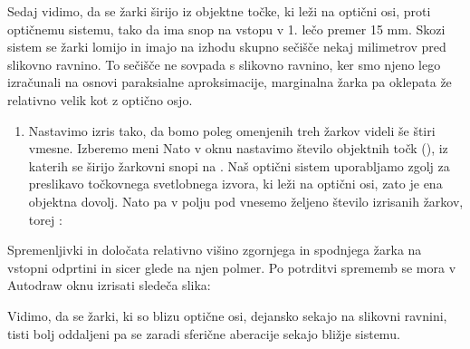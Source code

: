 \documentclass[letterpaper,10pt,english]{sphinxmanual}
\begin{document}
\begin{figure}[htbp]
\centering

\noindent{}
\end{figure}

\sphinxAtStartPar
Sedaj vidimo, da se žarki širijo iz objektne točke, ki leži na optični osi, proti optičnemu sistemu, tako da ima snop na vstopu v 1. lečo premer 15 mm. Skozi sistem se žarki lomijo in imajo na izhodu skupno sečišče nekaj milimetrov pred slikovno ravnino. To sečišče ne sovpada s slikovno ravnino, ker smo njeno lego izračunali na osnovi paraksialne aproksimacije, marginalna žarka pa oklepata že relativno velik kot z optično osjo.
\begin{enumerate}
%
\setcounter{enumi}{2}
\item {} 
\sphinxAtStartPar
Nastavimo izris tako, da bomo poleg omenjenih treh žarkov videli še štiri vmesne. Izberemo meni  Nato v oknu  nastavimo število objektnih točk (), iz katerih se širijo žarkovni snopi na . Naš optični sistem uporabljamo zgolj za preslikavo točkovnega svetlobnega izvora, ki leži na optični osi, zato je ena objektna dovolj. Nato pa v polju pod  vnesemo željeno število izrisanih žarkov, torej :

\end{enumerate}

\begin{figure}[htbp]
\centering

\noindent{}
\end{figure}

\sphinxAtStartPar
Spremenljivki  in  določata relativno višino zgornjega in spodnjega žarka na vstopni odprtini in sicer glede na njen polmer. Po potrditvi sprememb se mora v Autodraw oknu izrisati sledeča slika:

\begin{figure}[htbp]
\centering

\noindent{}
\end{figure}

\sphinxAtStartPar
Vidimo, da se žarki, ki so blizu optične osi, dejansko sekajo na slikovni ravnini, tisti bolj oddaljeni pa se zaradi sferične aberacije sekajo bližje sistemu.
\end{document}
